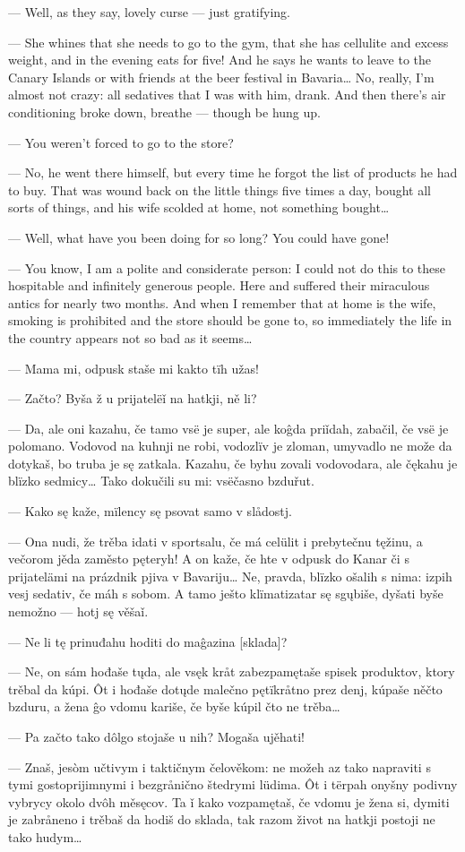 — Well, as they say, lovely curse — just gratifying.

— She whines that she needs to go to the gym, that she has cellulite and excess weight, and in the evening eats for five! And he says he wants to leave to the Canary Islands or with friends at the beer festival in Bavaria… No, really, I’m almost not crazy: all sedatives that I was with him, drank. And then there’s air conditioning broke down, breathe — though be hung up.

— You weren’t forced to go to the store?

— No, he went there himself, but every time he forgot the list of products he had to buy. That was wound back on the little things five times a day, bought all sorts of things, and his wife scolded at home, not something bought…

— Well, what have you been doing for so long? You could have gone!

— You know, I am a polite and considerate person: I could not do this to these hospitable and infinitely generous people. Here and suffered their miraculous antics for nearly two months. And when I remember that at home is the wife, smoking is prohibited and the store should be gone to, so immediately the life in the country appears not so bad as it seems…


— Mama mi, odpusk staše mi kakto tïh užas!

— Začto? Byša ž u prijatelëǐ na hatkji, ně li?

— Da, ale oni kazahu, če tamo vsë je super, ale koĝda priǐdah, zabačil, če vsë je polomano. Vodovod na kuhnji ne robi, vodozlïv je zloman, umyvadlo ne može da dotykaš, bo truba je sę zatkala. Kazahu, če byhu zovali vodovodara, ale čękahu je blïzko sedmicy… Tako dokučili su mi: vsëčasno bzduřut.

— Kako sę kaže, mïlency sę psovat samo v slådostj.

— Ona nudi, že trěba idati v sportsalu, če má celülit i prebytečnu tęžinu, a večorom jěda zaměsto pęteryh! A on kaže, če hte v odpusk do Kanar či s prijatelämi na prázdnik pjiva v Bavariju… Ne, pravda, blïzko ošalih s nima: izpih vesj sedativ, če máh s sobom. A tamo ješto klïmatizatar sę sgųbiše, dyšati byše nemožno — hotj sę věšaǐ.

— Ne li tę prinuđahu hoditi do maĝazina [sklada]?

— Ne, on sám hođaše tųda, ale vsęk kråt zabezpamętaše spisek produktov, ktory trěbal da kúpi. Ôt i hođaše dotųde malečno pętïkråtno prez denj, kúpaše něčto bzduru, a žena ĝo vdomu kariše, če byše kúpil čto ne trěba…

— Pa začto tako dôlgo stojaše u nih? Mogaša ujěhati!

— Znaš, jesòm učtivym i taktičnym čelověkom: ne možeh az tako napraviti s tymi gostoprijimnymi i bezgrånično štedrymi lüdima. Ôt i tërpah onyšny podivny vybrycy okolo dvôh měsęcov. Ta ǐ kako vozpamętaš, če vdomu je žena si, dymiti je zabråneno i trěbaš da hodiš do sklada, tak razom život na hatkji postoji ne tako hudym…


